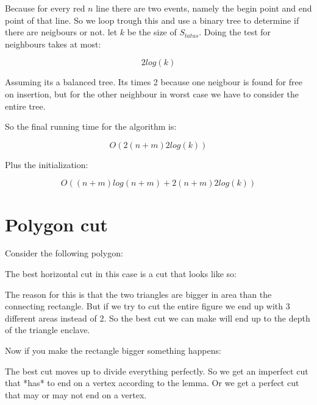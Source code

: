 \documentclass{article}
\begin{document}
Because for every red $n$ line there are two events, namely the begin point and
end point of that line.
So we loop trough this and use a binary tree to determine if there are neigbours
or not.
let $k$ be the size of $S_{tatus}$.
Doing the test for neighbours takes at most:

\[2 log(k)\]

Assuming its a balanced tree. Its times 2 because one neigbour is found for
free on insertion, but for the other neighbour in worst case we have to
consider the entire tree.

So the final running time for the algorithm is:

\[O(2(n+m) 2log(k))\]

Plus the initialization:

\[O((n+m)log(n+m)+2(n+m) 2log(k))\]

\section{Polygon cut}
Consider the following polygon:


The best horizontal cut in this case is a cut that looks like so:


The reason for this is that the two triangles are bigger in area than
the connecting rectangle. But if we try to cut the entire figure we
end up with 3 different areas instead of 2. So the best cut we can
make will end up to  the depth of the triangle enclave.

Now if you make the rectangle bigger something happens:


The best cut moves up to divide everything perfectly.
So we get an imperfect cut that *has* to end on a vertex according to
the lemma. Or we get a perfect cut that may or may not end on a vertex.
\end{document}
